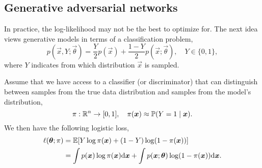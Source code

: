 \subsection{Generative adversarial networks}

In practice, the log-likelihood may not be the best to optimize for. The next idea views generative
models in terms of a classification problem, \[
    p(\vec{x}, Y; \vec{\theta}) = \frac{Y}{2} p(\vec{x}) + \frac{1 - Y}{2} p(\vec{x}; \vec{\theta}), \quad Y \in \{ 0,1 \},
\]
where $Y$ indicates from which distribution $\vec{x}$ is sampled.

Assume that we have access to a classifier (or discriminator) that can distinguish between samples
from the true data distribution and samples from the model's distribution, \[
    \pi: \mathbb{R}^n \to [0, 1], \quad \pi(\bm{x}) \approx \mathbb{P}(Y = 1 \mid \bm{x}).
\]
We then have the following logistic loss,
\begin{align*}
    \ell(\bm{\theta}; \pi) & = \mathbb{E}[Y \log \pi(\bm{x}) + (1-Y) \log(1-\pi(\bm{x}))]                                                                           \\
                            & = \int p(\bm{x}) \log \pi(\bm{x}) \mathrm{d}\bm{x} + \int p(\bm{x}; \bm{\theta}) \log (1 - \pi(\bm{x})) \mathrm{d}\bm{x}.
\end{align*}

